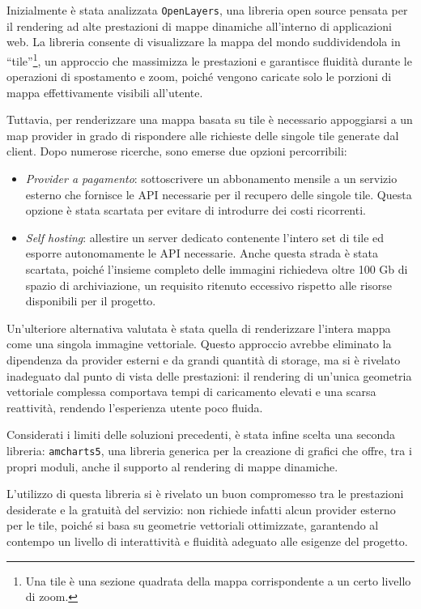 Inizialmente è stata analizzata \texttt{OpenLayers}, una libreria open source pensata per il rendering ad alte prestazioni di mappe dinamiche all'interno di applicazioni web. La libreria consente di visualizzare la mappa del mondo suddividendola in ``tile''\footnote{Una tile è una sezione quadrata della mappa corrispondente a un certo livello di zoom.}, un approccio che massimizza le prestazioni e garantisce fluidità durante le operazioni di spostamento e zoom, poiché vengono caricate solo le porzioni di mappa effettivamente visibili all'utente.

Tuttavia, per renderizzare una mappa basata su tile è necessario appoggiarsi a un map provider in grado di rispondere alle richieste delle singole tile generate dal client. Dopo numerose ricerche, sono emerse due opzioni percorribili:
\begin{itemize}
    \item \emph{Provider a pagamento}: sottoscrivere un abbonamento mensile a un servizio esterno che fornisce le \ac{API} necessarie per il recupero delle singole tile. Questa opzione è stata scartata per evitare di introdurre dei costi ricorrenti.
    \item \emph{Self hosting}: allestire un server dedicato contenente l'intero set di tile ed esporre autonomamente le \ac{API} necessarie. Anche questa strada è stata scartata, poiché l'insieme completo delle immagini richiedeva oltre 100 Gb di spazio di archiviazione, un requisito ritenuto eccessivo rispetto alle risorse disponibili per il progetto.
\end{itemize}

Un'ulteriore alternativa valutata è stata quella di renderizzare l'intera mappa come una singola immagine vettoriale. Questo approccio avrebbe eliminato la dipendenza da provider esterni e da grandi quantità di storage, ma si è rivelato inadeguato dal punto di vista delle prestazioni: il rendering di un'unica geometria vettoriale complessa comportava tempi di caricamento elevati e una scarsa reattività, rendendo l'esperienza utente poco fluida.

Considerati i limiti delle soluzioni precedenti, è stata infine scelta una seconda libreria: \texttt{amcharts5}, una libreria generica per la creazione di grafici che offre, tra i propri moduli, anche il supporto al rendering di mappe dinamiche.

L'utilizzo di questa libreria si è rivelato un buon compromesso tra le prestazioni desiderate e la gratuità del servizio: non richiede infatti alcun provider esterno per le tile, poiché si basa su geometrie vettoriali ottimizzate, garantendo al contempo un livello di interattività e fluidità adeguato alle esigenze del progetto.